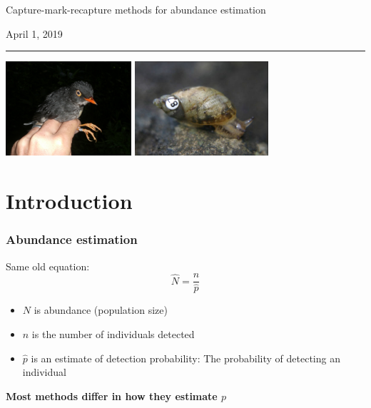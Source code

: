 \documentclass[color=usenames,dvipsnames]{beamer}\usepackage[]{graphicx}\usepackage[]{color}
\begin{document}

\begin{frame}[plain]
  \begin{center}
    {\huge Capture-mark-recapture methods for abundance estimation \par}
    \vspace{0.5cm}
    { \Large April 1, 2019} \\
    {\color{RoyalBlue} \rule{\textwidth}{1pt}}
    \vfill
    \includegraphics[height=3.5cm,keepaspectratio]{figs/SBNT} %
    \hspace{0.5cm}
      \includegraphics[height=3.5cm,keepaspectratio]{figs/Novisuccinea_chittenangoensis_4}
  \end{center}
\end{frame}




\section{Introduction}


\begin{frame}
  \frametitle{Abundance estimation}
  \large
  Same old equation:
  \[
    \hat{N} = \frac{n}{\hat{p}}
  \]
  \begin{itemize}
    \item $N$ is abundance (population size)
    \item $n$ is the number of individuals detected
    \item $\hat{p}$ is an estimate of detection probability: The probability
      of detecting an individual
  \end{itemize}
  \pause
  \vfill
  \Large \bf
  Most methods differ in how they estimate $p$
\end{frame}
\end{document}
